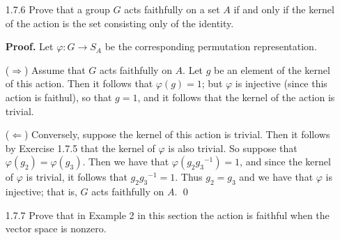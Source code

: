 \begin{enumerate}
      \textbf{Proof.} Let $K_1$ be the kernel of the action of $G$ on $A$ and
      let $K_2$ be the kernel of the permutation representation
      $\varphi : G \rightarrow S_A$. The proof follows since
      \begin{align*}
         g \in K_1 &\Longleftrightarrow ga = a \quad\text{ for all } a \in A \\
            &\Longleftrightarrow \varphi(g)(a)=a\quad\text{ for all } a\in A \\
            &\Longleftrightarrow \varphi(g) = 1 \\
            &\Longleftrightarrow g \in K_2.
      \end{align*} \qed
   \item[1.7.6]   Prove that a group $G$ acts faithfully on a set $A$ if and
                  only if the kernel of the action is the set consisting only of
                  the identity.

      \textbf{Proof.} Let $\varphi : G \rightarrow S_A$ be the corresponding 
      permutation representation.

      ($\Rightarrow$) Assume that $G$ acts faithfully on $A$. Let $g$ be an
      element of the kernel of this action. Then it follows that
      $\varphi(g) = 1$; but $\varphi$ is injective (since this action is
      faithul), so that $g = 1$, and it follows that the kernel of the action is
      trivial.

      ($\Leftarrow$) Conversely, suppose the kernel of this action is trivial.
      Then it follows by Exercise 1.7.5 that the kernel of $\varphi$ is also
      trivial. So suppose that $\varphi(g_2) = \varphi(g_3)$. Then we have
      that $\varphi(g_2{g_3}^{-1}) = 1$, and since the kernel of $\varphi$ is 
      trivial, it follows that $g_2{g_3}^{-1} = 1$. Thus $g_2 = g_3$ and we
      have that $\varphi$ is injective; that is, $G$ acts faithfully on $A$.
      \qed

   \item[1.7.7]   Prove that in Example 2 in this section the action is
                  faithful when the vector space is nonzero.


\end{enumerate}
